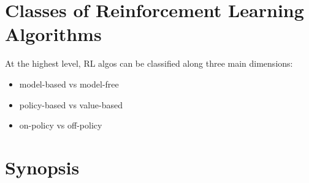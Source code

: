 \documentclass[../report.tex]{subfiles}
\begin{document}
\section{Classes of Reinforcement Learning Algorithms}

At the highest level, RL algos can be classified along three main dimensions:

\begin{itemize}
    \item model-based vs model-free
    \item policy-based vs value-based
    \item on-policy vs off-policy
\end{itemize}


\section{Synopsis}
\end{document}
